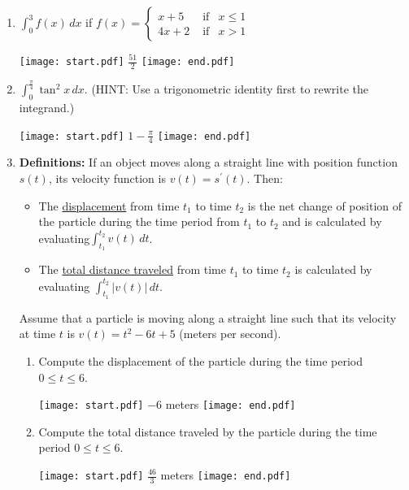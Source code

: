 \documentclass[12pt]{article}
\begin{document}
\begin{enumerate}
\item $\int_0^3 f(x) \,dx$ if $f(x)=\left\{\begin{array}{lll}
x+5 & \text{  if} & x \leq 1\\
4x+2 & \text{  if} & x > 1
\end{array}\right.$

\texttt{[image: start.pdf]}
{{$\frac{51}{2}$}}
\texttt{[image: end.pdf]}


\item $\int_0^{\frac{\pi}{4}} \tan^2{x} \,dx$.  (HINT: Use a trigonometric identity first to rewrite the integrand.)

\texttt{[image: start.pdf]}
{{$1-\frac{\pi}{4}$}}
\texttt{[image: end.pdf]}


\item {\bf Definitions:} If an object moves along a straight line with position function $s(t)$, its velocity function is $v(t)=s^{\prime}(t)$.  Then:

\begin{itemize}

\item The \underline{displacement} from time $t_1$ to time $t_2$ is the net change of position of the particle during the time period from $t_1$ to $t_2$ and is calculated by evaluating$\int_{t_1}^{t_2} v(t) \,dt$.

\item The \underline{total distance traveled} from time $t_1$ to time $t_2$ is calculated by evaluating $\int_{t_1}^{t_2} |v(t)| \,dt$.

\end{itemize}

Assume that a particle is moving along a straight line such that its velocity at time $t$ is $v(t)=t^2-6t+5$  (meters per second).  
\begin{enumerate}

\item Compute the displacement of the particle during the time period $0 \leq t \leq 6$.

\texttt{[image: start.pdf]}
{{$-6$ meters}}
\texttt{[image: end.pdf]}


\item Compute the total distance traveled by the particle during the time period $0 \leq t \leq 6$.

\texttt{[image: start.pdf]}
{{$\frac{46}{3}$ meters}}
\texttt{[image: end.pdf]}


\end{enumerate}


\end{enumerate}
\end{document}
